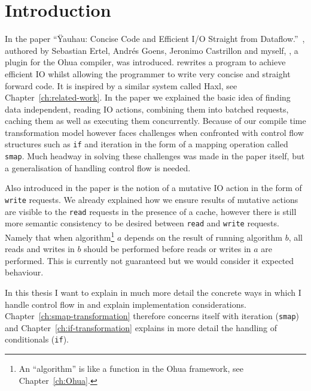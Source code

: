 \chapter{Introduction}

\label{ch:Intro}



In the paper ``Ÿauhau: Concise Code and Efficient I/O Straight from Dataflow.''~\cite{ErtelGoensAdamEtAl2016}, authored by Sebastian Ertel, Andrés Goens, Jeronimo Castrillon and myself, \yauhau{}, a plugin for the Ohua\cite{Ertel:2015:OID:2807426.2807431}\cite{Ohua:library:link} compiler, was introduced.
\yauhau{} rewrites a program to achieve efficient IO whilst allowing the programmer to write very concise and straight forward code.
It is inspired by a similar system called Haxl, see Chapter~\ref{ch:related-work}.
In the paper we explained the basic idea of finding data independent, reading IO actions, combining them into batched requests, caching them as well as executing them concurrently.
Because of our compile time transformation model however \yauhau{} faces challenges when confronted with control flow structures such as \texttt{if} and iteration in the form of a mapping operation called \texttt{smap}.
Much headway in solving these challenges was made in the paper itself, but a generalisation of handling control flow is needed.

Also introduced in the paper is the notion of a mutative IO action in the form of \texttt{write} requests.
We already explained how we ensure results of mutative actions are visible to the \texttt{read} requests in the presence of a cache, however there is still more semantic consistency to be desired between \texttt{read} and \texttt{write} requests.
Namely that when algorithm\footnote{An ``algorithm'' is like a function in the Ohua framework, see Chapter~\ref{ch:Ohua}.} $a$ depends on the result of running algorithm $b$, all reads and writes in $b$ should be performed before reads or writes in $a$ are performed.
This is currently not guaranteed but we would consider it expected behaviour.

In this thesis I want to explain in much more detail the concrete ways in which I handle control flow in \yauhau{} and explain implementation considerations.
Chapter~\ref{ch:smap-transformation} therefore concerns itself with iteration (\texttt{smap}) and Chapter~\ref{ch:if-transformation} explains in more detail the handling of conditionals (\texttt{if}).

